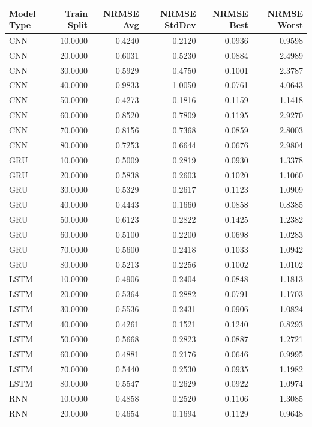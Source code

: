 \begin{tabular}{lrrrrr}
\toprule
Model Type & Train Split & NRMSE Avg & NRMSE StdDev & NRMSE Best & NRMSE Worst \\
\midrule
CNN & 10.0000 & 0.4240 & 0.2120 & 0.0936 & 0.9598 \\
CNN & 20.0000 & 0.6031 & 0.5230 & 0.0884 & 2.4989 \\
CNN & 30.0000 & 0.5929 & 0.4750 & 0.1001 & 2.3787 \\
CNN & 40.0000 & 0.9833 & 1.0050 & 0.0761 & 4.0643 \\
CNN & 50.0000 & 0.4273 & 0.1816 & 0.1159 & 1.1418 \\
CNN & 60.0000 & 0.8520 & 0.7809 & 0.1195 & 2.9270 \\
CNN & 70.0000 & 0.8156 & 0.7368 & 0.0859 & 2.8003 \\
CNN & 80.0000 & 0.7253 & 0.6644 & 0.0676 & 2.9804 \\
GRU & 10.0000 & 0.5009 & 0.2819 & 0.0930 & 1.3378 \\
GRU & 20.0000 & 0.5838 & 0.2603 & 0.1020 & 1.1060 \\
GRU & 30.0000 & 0.5329 & 0.2617 & 0.1123 & 1.0909 \\
GRU & 40.0000 & 0.4443 & 0.1660 & 0.0858 & 0.8385 \\
GRU & 50.0000 & 0.6123 & 0.2822 & 0.1425 & 1.2382 \\
GRU & 60.0000 & 0.5100 & 0.2200 & 0.0698 & 1.0283 \\
GRU & 70.0000 & 0.5600 & 0.2418 & 0.1033 & 1.0942 \\
GRU & 80.0000 & 0.5213 & 0.2256 & 0.1002 & 1.0102 \\
LSTM & 10.0000 & 0.4906 & 0.2404 & 0.0848 & 1.1813 \\
LSTM & 20.0000 & 0.5364 & 0.2882 & 0.0791 & 1.1703 \\
LSTM & 30.0000 & 0.5536 & 0.2431 & 0.0906 & 1.0824 \\
LSTM & 40.0000 & 0.4261 & 0.1521 & 0.1240 & 0.8293 \\
LSTM & 50.0000 & 0.5668 & 0.2823 & 0.0887 & 1.2721 \\
LSTM & 60.0000 & 0.4881 & 0.2176 & 0.0646 & 0.9995 \\
LSTM & 70.0000 & 0.5440 & 0.2530 & 0.0935 & 1.1982 \\
LSTM & 80.0000 & 0.5547 & 0.2629 & 0.0922 & 1.0974 \\
RNN & 10.0000 & 0.4858 & 0.2520 & 0.1106 & 1.3085 \\
RNN & 20.0000 & 0.4654 & 0.1694 & 0.1129 & 0.9648 \\

\end{tabular}
